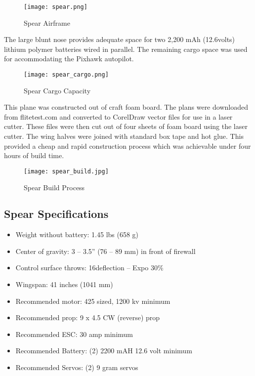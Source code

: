 \begin{figure}[!h]
 \centering
  \texttt{[image: spear.png]}
  \caption{Spear Airframe \cite{flitetest}}
  \label{fig:spear}
\end{figure}

The large blunt nose provides adequate space for two 2,200 mAh (12.6volts) lithium polymer batteries wired in parallel.  The remaining cargo space was used for accommodating the Pixhawk autopilot.

\begin{figure}[!h]
 \centering
  \texttt{[image: spear\_cargo.png]}
  \caption{Spear Cargo Capacity \cite{flitetest}}
  \label{fig:spear_cargo}
\end{figure}

This plane was constructed out of craft foam board.  The plans were downloaded from flitetest.com\cite{flitetest} and converted to CorelDraw vector files for use in a laser cutter.  These files were then cut out of four sheets of foam board using the laser cutter.  The wing halves were joined with standard box tape and hot glue.  This provided a cheap and rapid construction process which was achievable under four hours of build time.

\begin{figure}[!h]
 \centering
  \texttt{[image: spear\_build.jpg]}
  \caption{Spear Build Process}
  \label{fig:spear_build}
\end{figure}

\subsection{Spear Specifications}
\begin{itemize}
 \item Weight without battery: 1.45 lbs (658 g)
 \item Center of gravity: 3 – 3.5” (76 – 89 mm) in front of firewall
 \item Control surface throws: 16\degrees  deflection – Expo 30\%
 \item Wingspan: 41 inches (1041 mm)
 \item Recommended motor: 425 sized, 1200 kv minimum
 \item Recommended prop: 9 x 4.5 CW (reverse) prop
 \item Recommended ESC: 30 amp minimum
 \item Recommended Battery: (2) 2200 mAH 12.6 volt minimum
 \item Recommended Servos: (2) 9 gram servos 
\end{itemize}


